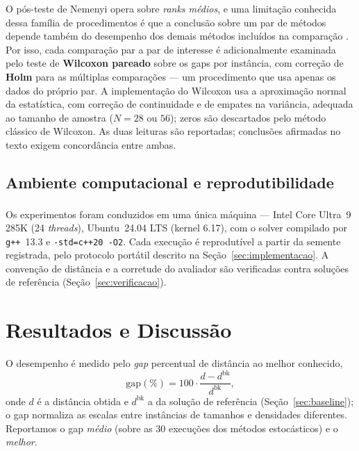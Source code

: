 \documentclass[12pt, a4paper]{article}
\begin{document}
O pós-teste de Nemenyi opera sobre \emph{ranks médios}, e uma limitação conhecida dessa família de procedimentos é que a conclusão sobre um par de métodos depende também do desempenho dos demais métodos incluídos na comparação \citep{benavoli2016should}. Por isso, cada comparação par a par de interesse é adicionalmente examinada pelo teste de \textbf{Wilcoxon pareado} sobre os gaps por instância, com correção de \textbf{Holm} para as múltiplas comparações \citep{garcia2008extension} --- um procedimento que usa apenas os dados do próprio par. A implementação do Wilcoxon usa a aproximação normal da estatística, com correção de continuidade e de empates na variância, adequada ao tamanho de amostra ($N=28$ ou $56$); zeros são descartados pelo método clássico de Wilcoxon. As duas leituras são reportadas; conclusões afirmadas no texto exigem concordância entre ambas.

\subsection{Ambiente computacional e reprodutibilidade}\label{sec:ambiente}
Os experimentos foram conduzidos em uma única máquina --- Intel\textsuperscript{\textregistered} Core\textsuperscript{\texttrademark} Ultra~9 285K (24 \textit{threads}), Ubuntu~24.04 LTS (kernel 6.17), com o solver compilado por \texttt{g++}~13.3 e \texttt{-std=c++20 -O2}. Cada execução é reprodutível a partir da semente registrada, pelo protocolo portátil descrito na Seção~\ref{sec:implementacao}. A convenção de distância e a corretude do avaliador são verificadas contra soluções de referência (Seção~\ref{sec:verificacao}).

\section{Resultados e Discussão}\label{sec:resultados}

O desempenho é medido pelo \emph{gap} percentual de distância ao melhor conhecido,
\begin{equation}
\mathrm{gap}(\%)=100\cdot\frac{d-d^{\mathrm{bk}}}{d^{\mathrm{bk}}},
\end{equation}
onde $d$ é a distância obtida e $d^{\mathrm{bk}}$ a da solução de referência (Seção~\ref{sec:baseline}); o gap normaliza as escalas entre instâncias de tamanhos e densidades diferentes. Reportamos o gap \emph{médio} (sobre as 30 execuções dos métodos estocásticos) e o \emph{melhor}.
\end{document}

